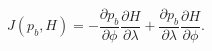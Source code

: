 \begin{equation}
    J(p_b,H) = - \frac{\partial p_b}{\partial \phi}\frac{\partial H}{\partial\lambda} + \frac{\partial p_b}{\partial\lambda}\frac{\partial H}{\partial \phi}.
\label{EQN:BPT}
\end{equation}
